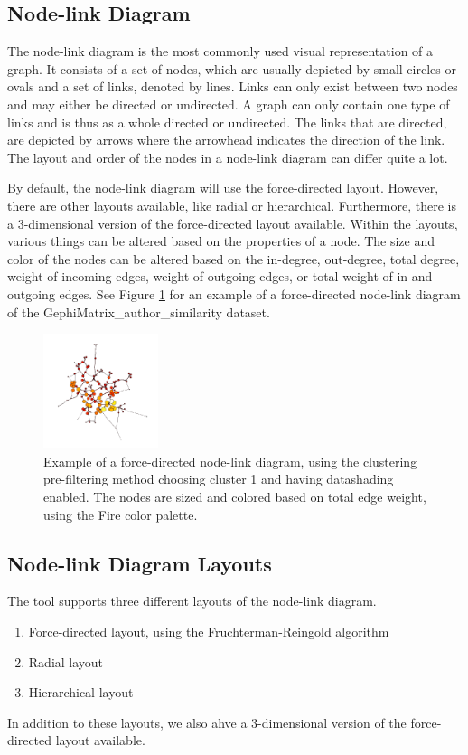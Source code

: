 \documentclass[journal]{vgtc}                %
\begin{document}
\subsection{Node-link Diagram} \label{sect:NL} %
The node-link diagram is the most commonly used visual representation of a graph. It consists of a set of nodes, which are usually depicted by small circles or ovals and a set of links, denoted by lines. Links can only exist between two nodes and may either be directed or undirected. A graph can only contain one type of links and is thus as a whole directed or undirected. The links that are directed, are depicted by arrows where the arrowhead indicates the direction of the link. The layout and order of the nodes in a node-link diagram can differ quite a lot.

By default, the node-link diagram will use the force-directed layout. However, there are other layouts available, like radial or hierarchical. Furthermore, there is a 3-dimensional version of the force-directed layout available. Within the layouts, various things can be altered based on the properties of a node. The size and color of the nodes can be altered based on the in-degree, out-degree, total degree, weight of incoming edges, weight of outgoing edges, or total weight of in and outgoing edges. See Figure \ref{fig:NLExample} for an example of a force-directed node-link diagram of the GephiMatrix\_author\_similarity dataset.

\begin{figure}[hbt]
    \centering
    \includegraphics[width=0.3\textwidth]{example_nodelink.png}
    \caption{Example of a force-directed node-link diagram, using the clustering pre-filtering method choosing cluster 1 and having datashading enabled. The nodes are sized and colored based on total edge weight, using the Fire color palette.}
    \label{fig:NLExample}
\end{figure}

\subsection{Node-link Diagram Layouts} \label{sect:NLlayouts} %
The tool supports three different layouts of the node-link diagram. 
\begin{enumerate}
    \setlength\itemsep{0em}
    \item Force-directed layout, using the Fruchterman-Reingold algorithm
    \item Radial layout
    \item Hierarchical layout
\end{enumerate}
In addition to these layouts, we also ahve a 3-dimensional version of the force-directed layout available.
\end{document}
